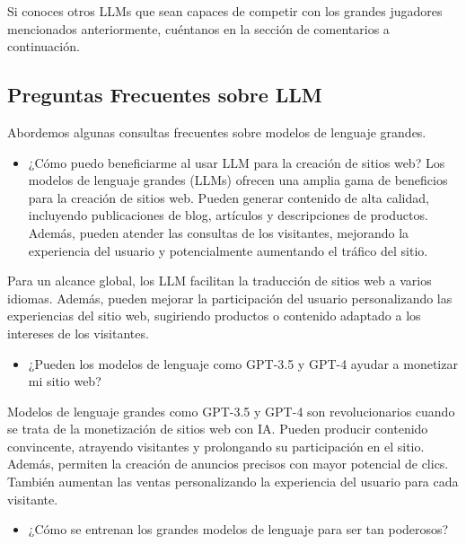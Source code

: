 \documentclass[a4paper12pt]{article}
\providecommand{\tightlist}{%
      \setlength{\itemsep}{0pt}\setlength{\parskip}{0pt}}
\begin{document}
Si conoces otros LLMs que sean capaces de competir con los grandes
jugadores mencionados anteriormente, cuéntanos en la sección de
comentarios a continuación.

    \hypertarget{preguntas-frecuentes-sobre-llm}{%
\subsection{Preguntas Frecuentes sobre
LLM}\label{preguntas-frecuentes-sobre-llm}}

Abordemos algunas consultas frecuentes sobre modelos de lenguaje
grandes.

\begin{itemize}
\tightlist
\item
  ¿Cómo puedo beneficiarme al usar LLM para la creación de sitios web?
  Los modelos de lenguaje grandes (LLMs) ofrecen una amplia gama de
  beneficios para la creación de sitios web. Pueden generar contenido de
  alta calidad, incluyendo publicaciones de blog, artículos y
  descripciones de productos. Además, pueden atender las consultas de
  los visitantes, mejorando la experiencia del usuario y potencialmente
  aumentando el tráfico del sitio.
\end{itemize}

Para un alcance global, los LLM facilitan la traducción de sitios web a
varios idiomas. Además, pueden mejorar la participación del usuario
personalizando las experiencias del sitio web, sugiriendo productos o
contenido adaptado a los intereses de los visitantes.

\begin{itemize}
\tightlist
\item
  ¿Pueden los modelos de lenguaje como GPT-3.5 y GPT-4 ayudar a
  monetizar mi sitio web?
\end{itemize}

Modelos de lenguaje grandes como GPT-3.5 y GPT-4 son revolucionarios
cuando se trata de la monetización de sitios web con IA. Pueden producir
contenido convincente, atrayendo visitantes y prolongando su
participación en el sitio. Además, permiten la creación de anuncios
precisos con mayor potencial de clics. También aumentan las ventas
personalizando la experiencia del usuario para cada visitante.

\begin{itemize}
\tightlist
\item
  ¿Cómo se entrenan los grandes modelos de lenguaje para ser tan
  poderosos?
\end{itemize}
\end{document}
